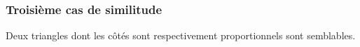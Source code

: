 \documentclass[a4paper,12pt]{article}
\begin{document}
\subsubsection{Troisième cas de similitude}
\begin{theorem}
Deux triangles dont les côtés sont respectivement proportionnels sont semblables.
\end{theorem}
\end{document}
